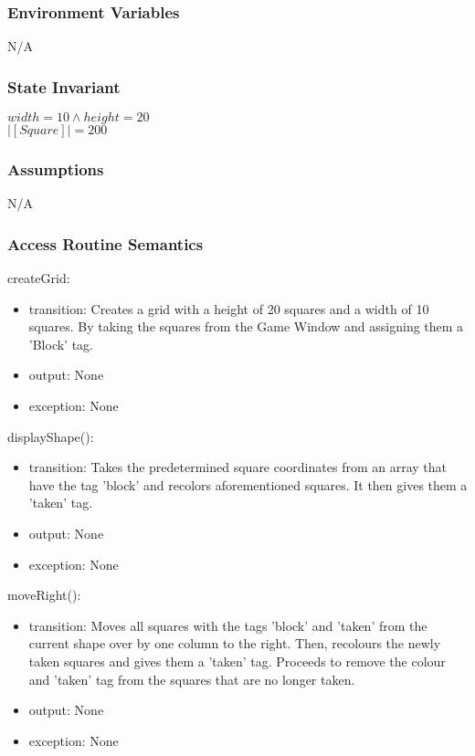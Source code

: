 \documentclass[12pt]{article}
\begin{document}
\subsubsection*{Environment Variables}

N/A

\subsubsection*{State Invariant}

$width = 10 \land height = 20$\\
$|[Square]| = 200$

\subsubsection*{Assumptions}

N/A

\subsubsection* {Access Routine Semantics}

\noindent createGrid:
\begin{itemize}
\item transition: Creates a grid with a height of 20 squares and a width of 10 squares. By taking the squares from the Game Window and assigning them a 'Block' tag.
\item output: None
\item exception: None
\end{itemize}

\noindent displayShape():
\begin{itemize}
\item transition: Takes the predetermined square coordinates from an array that have the tag 'block' and recolors aforementioned squares. It then gives them a 'taken' tag.  
\item output: None
\item exception: None
\end{itemize}

\noindent moveRight():
\begin{itemize}
\item transition: Moves all squares with the tags 'block' and 'taken' from the current shape over by one column to the right. Then, recolours the newly taken squares and gives them a 'taken' tag. Proceeds to remove the colour and 'taken' tag from the squares that are no longer taken.
\item output: None
\item exception: None
\end{itemize}
\end{document}
